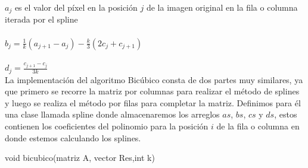 $a_j$ es el valor del píxel en la posición $j$ de la imagen original en la fila o columna iterada por el spline \\ \\
$b_{j} = \frac{1}{k}(a_{j+1} - a_j) - \frac{k}{3}(2c_j + c_{j+1})$ \\ \\
$d_{j} = \frac{c_{j+1} - c_{j}}{3k} $ \\

La implementación del algoritmo Bicúbico consta de dos partes muy similares, ya que primero se recorre la matriz por columnas para realizar el método de splines y luego se realiza el método por filas para completar la matriz.
Definimos para él una clase llamada spline donde almacenaremos los arreglos $as$, $bs$, $cs$ y $ds$, estos contienen los coeficientes del polinomio para la posición $i$ de la fila o columna en donde estemos calculando los splines.

\begin{algorithm}[H]
\begin{algorithmic}[1]\parskip=1mm
\caption{void bicubico(matriz A, vector Res,int k)}
\end{algorithmic}
\end{algorithm}

